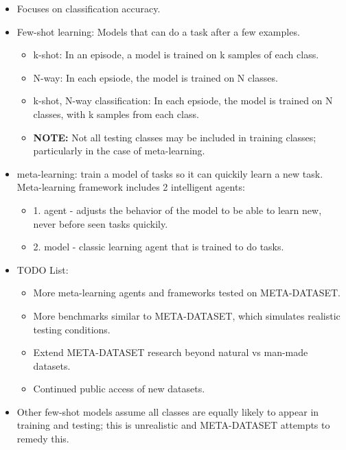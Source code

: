 \documentclass{article}
\begin{document}
	\begin{itemize}
		\item Focuses on classification accuracy.
		
		\item Few-shot learning: Models that can do a task after a few examples.
		
		\begin{itemize}
			\item k-shot: In an episode, a model is trained on k samples of each class.
			\item N-way: In each epsiode, the model is trained on N classes.
			\item k-shot, N-way classification: In each epsiode, the model is trained on N classes, with k samples from each class.
			\item \textbf{NOTE:} Not all testing classes may be included in training classes; particularly in the case of meta-learning.
		\end{itemize}
		
		\item meta-learning: train a model of tasks so it can quickily learn a new task. Meta-learning framework includes 2 intelligent agents:
		
		\begin{itemize}
			\item 1. agent - adjusts the behavior of the model to be able to learn new, never before seen tasks quickily.
			\item 2. model - classic learning agent that is trained to do tasks.
		\end{itemize}
		
		\item TODO List:
		
		\begin{itemize}
			\item More meta-learning agents and frameworks tested on META-DATASET.
			\item More benchmarks similar to META-DATASET, which simulates realistic testing conditions.
			\item Extend META-DATASET research beyond natural vs man-made datasets.
			\item Continued public access of new datasets.
		\end{itemize}
		
		\item Other few-shot models assume all classes are equally likely to appear in training and testing; this is unrealistic and META-DATASET attempts to remedy this.
		

\end{itemize}
\end{document}
